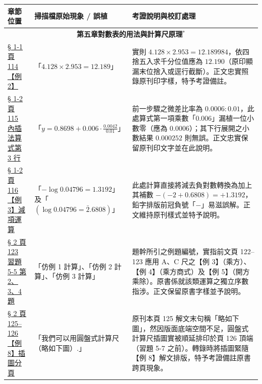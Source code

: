 \documentclass[a4paper,12pt,twoside]{article}
\begin{document}
\begin{table}[H]
\centering
\small
\renewcommand{\arraystretch}{1.35}
\begin{tabularx}{\textwidth}{|p{3.0cm}|p{3.8cm}|X|}
\hline
\textbf{章節位置} & \textbf{掃描檔原始現象 / 誤植} & \textbf{考證說明與校訂處理} \\ \hline

\multicolumn{3}{|c|}{\textbf{第五章\quad 對數表的用法與計算尺原理$^*$}} \\ \hline

\hyperref[note:b2-ch5-p114-ex2]{§ 1-1 頁 114 【例 2】} & 
「$4.128 \times 2.953 = 12.189$」 & 
實則 $4.128 \times 2.953 = 12.189984$，依四捨五入求千分位值應為 $12.190$（原印顯漏末位捨入或逕行截斷）。正文忠實照錄原刊印字樣，特予考證備註。 \\ \hline

\hyperref[note:b2-ch5-p115-interpolation-zero]{§ 1-2 頁 115 內插法算式第 3 行} & 
「$y = 0.8698 + 0.006 \cdot \frac{0.0042}{0.01}$」 & 
前一步驟之微差比率為 $0.0006 : 0.01$，此處算式第一項乘數「$0.006$」漏植一位小數零（應為 $0.0006$）；其下行展開之小數結果 $0.000252$ 則無誤。正文忠實保留原刊印文字並在此說明。 \\ \hline

\hyperref[note:b2-ch5-p116-ex3-minus-log]{§ 1-2 頁 116 【例 3】減項運算} & 
「$-\log 0.04796 = 1.3192$」及「$(\log 0.04796 = \bar{2}.6808)$」 & 
此處計算直接將減去負對數轉換為加上其補數 $-( -2 + 0.6808) = + 1.3192$，鉛字排版前冠負號「$-$」易滋誤解。正文維持原刊樣式並特予說明。 \\ \hline

\hyperref[note:b2-ch5-p123-ex5-5-ref]{§ 2 頁 123 習題 5-5 第 2、3、4 題} & 
「仿例 1 計算」、「仿例 2 計算」、「仿例 3 計算」 & 
題幹所引之例題編號，實指前文頁 122–123 應用 A、C 尺之【例 3】（乘方）、【例 4】（乘方商式）及【例 5】（開方乘除）。原書係就該類運算之獨立序數指涉。正文保留原書字樣並予說明。 \\ \hline

\hyperref[note:b2-ch5-p125-circular-rule-split]{§ 2 頁 125–126 【例 8】插圖分頁} & 
「我們可以用圓盤式計算尺（略如下圖）.」 & 
原刊本頁 125 解文末句稱「略如下圖」，然因版面底端空間不足，圓盤式計算尺插圖實被順延排印於頁 126 頂端（習題 5-7 之前）。轉錄時將插圖緊隨【例 8】解文排版，特予考證備註原書跨頁現象。 \\ \hline

\end{tabularx}
\end{table}

\clearpage
\tableofcontents
\newpage

\end{document}
